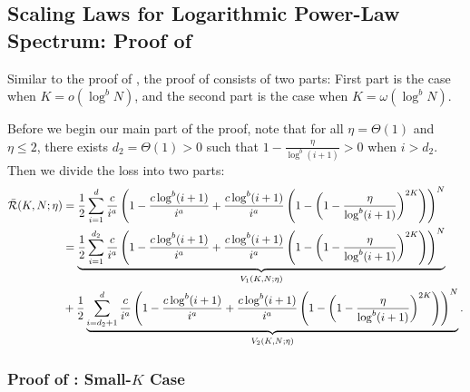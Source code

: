 \subsection{Scaling Laws for Logarithmic Power-Law Spectrum: Proof of }\label{sec:proof-one-hot-scaling-law-log-spectrum}
Similar to the proof of , the proof of  consists of two parts:  First part is the case when $K = o(\log^b N)$, and the second part is the case when $K = \omega(\log^b N)$.

Before we begin our main part of the proof, note that for all $\eta=\Theta(1)$ and $\eta\leq 2$, there exists $d_2=\Theta(1)>0$ such that $1-\frac{\eta}{\log^b (i+1)}>0$ when $i>d_2$. Then we divide the loss into two parts:
\begin{align*}
    \Bar{\mathcal{R}}(K, N;\eta)&=\frac{1}{2}\sum_{i=1}^{d}\frac{c}{i^{a}}\left(1-\frac{c\log^b (i+1)}{i^{a}} + \frac{c\log^b (i+1)}{i^{a}}\left(1-\left(1-\frac{\eta}{\log^b (i+1)}\right)^{2K}\right)\right)^N  \\
    &=\underbrace{\frac{1}{2}\sum_{i=1}^{d_2}\frac{c}{i^{a}}\left(1-\frac{c\log^b (i+1)}{i^{a}} + \frac{c\log^b (i+1)}{i^{a}}\left(1-\left(1-\frac{\eta}{\log^b (i+1)}\right)^{2K}\right)\right)^N }_{V_1(K, N; \eta)} \\
    &+\frac{1}{2}\underbrace{\sum_{i=d_2 +1}^d\frac{c}{i^{a}}\left(1-\frac{c\log^b (i+1)}{i^{a}} + \frac{c\log^b (i+1)}{i^{a}}\left(1-\left(1-\frac{\eta}{\log^b (i+1)}\right)^{2K}\right)\right)^N }_{V_2(K, N; \eta)}.
\end{align*}


\subsubsection{Proof of : Small-$K$ Case}
